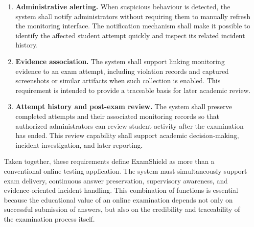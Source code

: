 \begin{enumerate}
    \item \textbf{Administrative alerting.} When suspicious behaviour is detected, the system shall notify administrators without requiring them to manually refresh the monitoring interface. The notification mechanism shall make it possible to identify the affected student attempt quickly and inspect its related incident history.

    \item \textbf{Evidence association.} The system shall support linking monitoring evidence to an exam attempt, including violation records and captured screenshots or similar artifacts when such collection is enabled. This requirement is intended to provide a traceable basis for later academic review.

    \item \textbf{Attempt history and post-exam review.} The system shall preserve completed attempts and their associated monitoring records so that authorized administrators can review student activity after the examination has ended. This review capability shall support academic decision-making, incident investigation, and later reporting.
\end{enumerate}

Taken together, these requirements define ExamShield as more than a conventional online testing application. The system must simultaneously support exam delivery, continuous answer preservation, supervisory awareness, and evidence-oriented incident handling. This combination of functions is essential because the educational value of an online examination depends not only on successful submission of answers, but also on the credibility and traceability of the examination process itself.
